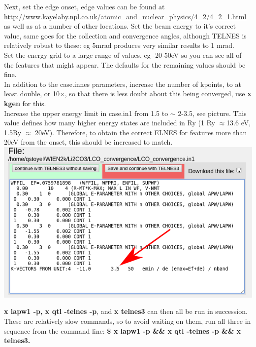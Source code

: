 \documentclass[12pt]{article}
\begin{document}
Next, set the edge onset, edge values can be found at \url{http://www.kayelaby.npl.co.uk/atomic_and_nuclear_physics/4_2/4_2_1.html} as well as at a number of other locations.  Set the beam energy to it's correct value, same goes for the collection and convergence angles, although TELNES is relatively robust to these: eg 5mrad produces very similar results to 1 mrad.\\

Set the energy grid to a large range of values, eg -20-50eV so you can see all of the features that might appear.  The defaults for the remaining values should be fine.\\

In addition to the case.innes parameters, increase the number of kpoints, to at least double, or 10$\times$, so that there is less doubt about this being converged, use \textbf{x kgen} for this.  \\

Increase the upper energy limit in case.in1 from 1.5 to $\sim$ 2-3.5, see picture.  This value defines how many higher energy states are included in Ry (1 Ry $\approx$13.6 eV, 1.5Ry $\approx$ 20eV). Therefore, to obtain the correct ELNES for features more than 20eV from the onset,  this should be increased to match.  \\

\includegraphics[scale=0.4]{./images/in1_edit.png}

\textbf{x lapw1 -p, x qtl -telnes -p}, and\textbf{ x telnes3} can then all be run in succession.  These are relatively slow commands, so to avoid waiting on them, run all three in sequence from the command line: \textbf{\$ x lapw1 -p \&\& x qtl -telnes -p \&\& x telnes3.}\\
\end{document}
